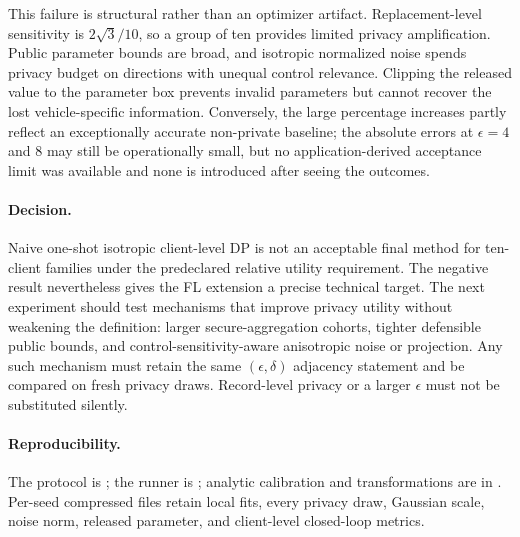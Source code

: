 This failure is structural rather than an optimizer artifact. Replacement-level
sensitivity is $2\sqrt3/10$, so a group of ten provides limited privacy
amplification. Public parameter bounds are broad, and isotropic normalized noise
spends privacy budget on directions with unequal control relevance. Clipping the
released value to the parameter box prevents invalid parameters but cannot
recover the lost vehicle-specific information. Conversely, the large percentage
increases partly reflect an exceptionally accurate non-private baseline; the
absolute errors at $\epsilon=4$ and 8 may still be operationally small, but no
application-derived acceptance limit was available and none is introduced after
seeing the outcomes.

\paragraph{Decision.}
Naive one-shot isotropic client-level DP is not an acceptable final method for
ten-client families under the predeclared relative utility requirement. The
negative result nevertheless gives the FL extension a precise technical target.
The next experiment should test mechanisms that improve privacy utility without
weakening the definition: larger secure-aggregation cohorts, tighter defensible
public bounds, and control-sensitivity-aware anisotropic noise or projection.
Any such mechanism must retain the same $(\epsilon,\delta)$ adjacency statement
and be compared on fresh privacy draws. Record-level privacy or a larger
$\epsilon$ must not be substituted silently.

\paragraph{Reproducibility.}
The protocol is ; the runner is
; analytic calibration
and transformations are in . Per-seed
compressed files retain local fits, every privacy draw, Gaussian scale, noise
norm, released parameter, and client-level closed-loop metrics.
